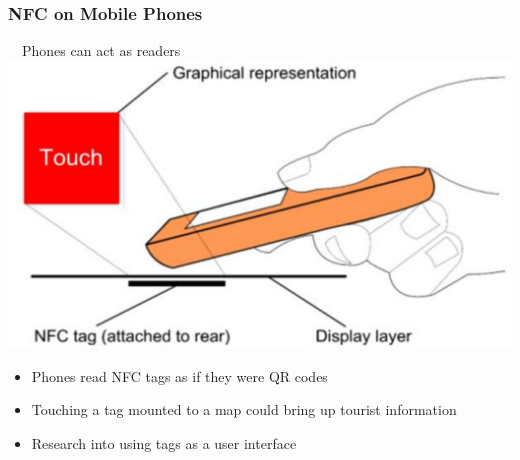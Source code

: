 \documentclass[unknownkeysallowed]{beamer}
\begin{document}
\begin{frame}
\frametitle{NFC on Mobile Phones}
  \begin{center}
  \begin{minipage}{.7\textwidth}
  \begin{block}{~~Phones can act as readers}\centering
      \includegraphics[width=\linewidth,height=0.2\textheight,keepaspectratio]{figures/hardy.png}
      \begin{itemize}
  		  \item{Phones read NFC tags as if they were QR codes}
        \pause
  		  \item{Touching a tag mounted to a map could bring up tourist information}
        \pause
        \item{Research into using tags as a user interface}
     	\end{itemize}
  \end{block}
  \end{minipage}
  \end{center}
\end{frame}
\end{document}
